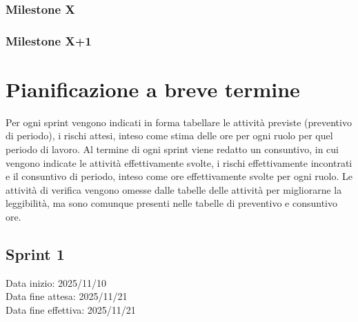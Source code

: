 \documentclass[a4paper,12pt]{article}
\begin{document}
\subsubsection{Milestone X}

\subsubsection{Milestone X+1}




\section{Pianificazione a breve termine}

Per ogni sprint vengono indicati in forma tabellare le attività previste (preventivo di periodo), i rischi attesi, inteso come stima delle ore per ogni ruolo per quel periodo di lavoro. Al termine di ogni sprint viene redatto un consuntivo, in cui vengono indicate le attività effettivamente svolte, i rischi effettivamente incontrati e il consuntivo di periodo, inteso come ore effettivamente svolte per ogni ruolo.
Le attività di verifica vengono omesse dalle tabelle delle attività per migliorarne la leggibilità, ma sono comunque presenti nelle tabelle di preventivo e consuntivo ore.

\subsection{Sprint 1}
Data inizio: 2025/11/10\\
Data fine attesa: 2025/11/21\\
Data fine effettiva: 2025/11/21
\end{document}
